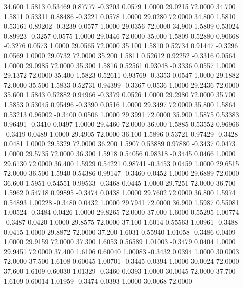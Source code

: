   34.600   1.5813   0.53469   0.87777  -0.3203   0.0579   1.0000  29.0215  72.0000
  34.700   1.5811   0.53311   0.88486  -0.3221   0.0578   1.0000  29.0280  72.0000
  34.800   1.5810   0.53161   0.89202  -0.3239   0.0577   1.0000  29.0356  72.0000
  34.900   1.5809   0.53024   0.89923  -0.3257   0.0575   1.0000  29.0446  72.0000
  35.000   1.5809   0.52880   0.90668  -0.3276   0.0573   1.0000  29.0565  72.0000
  35.100   1.5810   0.52734   0.91447  -0.3296   0.0569   1.0000  29.0732  72.0000
  35.200   1.5811   0.52612   0.92252  -0.3316   0.0564   1.0000  29.0985  72.0000
  35.300   1.5816   0.52561   0.93048  -0.3336   0.0557   1.0000  29.1372  72.0000
  35.400   1.5823   0.52611   0.93769  -0.3353   0.0547   1.0000  29.1882  72.0000
  35.500   1.5833   0.52731   0.94399  -0.3367   0.0536   1.0000  29.2436  72.0000
  35.600   1.5843   0.52882   0.94966  -0.3379   0.0526   1.0000  29.2980  72.0000
  35.700   1.5853   0.53045   0.95496  -0.3390   0.0516   1.0000  29.3497  72.0000
  35.800   1.5864   0.53213   0.96002  -0.3400   0.0506   1.0000  29.3991  72.0000
  35.900   1.5875   0.53383   0.96491  -0.3410   0.0497   1.0000  29.4460  72.0000
  36.000   1.5885   0.53552   0.96966  -0.3419   0.0489   1.0000  29.4905  72.0000
  36.100   1.5896   0.53721   0.97429  -0.3428   0.0481   1.0000  29.5329  72.0000
  36.200   1.5907   0.53889   0.97880  -0.3437   0.0473   1.0000  29.5735  72.0000
  36.300   1.5918   0.54056   0.98318  -0.3445   0.0466   1.0000  29.6130  72.0000
  36.400   1.5929   0.54221   0.98741  -0.3453   0.0459   1.0000  29.6515  72.0000
  36.500   1.5940   0.54386   0.99147  -0.3460   0.0452   1.0000  29.6889  72.0000
  36.600   1.5951   0.54551   0.99533  -0.3468   0.0445   1.0000  29.7251  72.0000
  36.700   1.5962   0.54718   0.99895  -0.3474   0.0438   1.0000  29.7602  72.0000
  36.800   1.5974   0.54893   1.00228  -0.3480   0.0432   1.0000  29.7941  72.0000
  36.900   1.5987   0.55081   1.00524  -0.3484   0.0426   1.0000  29.8265  72.0000
  37.000   1.6000   0.55295   1.00774  -0.3487   0.0420   1.0000  29.8575  72.0000
  37.100   1.6014   0.55563   1.00961  -0.3488   0.0415   1.0000  29.8872  72.0000
  37.200   1.6031   0.55940   1.01058  -0.3486   0.0409   1.0000  29.9159  72.0000
  37.300   1.6053   0.56589   1.01003  -0.3479   0.0404   1.0000  29.9451  72.0000
  37.400   1.6106   0.60040   1.00083  -0.3432   0.0394   1.0000  30.0003  72.0000
  37.500   1.6108   0.60045   1.00701  -0.3445   0.0394   1.0000  30.0024  72.0000
  37.600   1.6109   0.60030   1.01329  -0.3460   0.0393   1.0000  30.0045  72.0000
  37.700   1.6109   0.60014   1.01959  -0.3474   0.0393   1.0000  30.0068  72.0000
